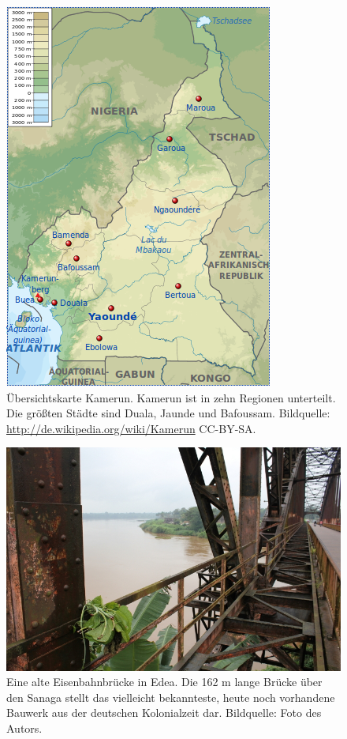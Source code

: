 \documentclass[a4paper,
fontsize=11pt,
oneside,
numbers=noperiodatend,
parskip=half-,
bibliography=totoc,
final
]{scrartcl}
\begin{document}
\begin{figure}[htbp]
\centering
\includegraphics{img/KarteKamerun.png}
\caption{Übersichtskarte Kamerun. Kamerun ist in zehn Regionen
unterteilt. Die größten Städte sind Duala, Jaunde und Bafoussam.
Bildquelle: \url{http://de.wikipedia.org/wiki/Kamerun} CC-BY-SA.}
\end{figure}

\begin{figure}[htbp]
\centering
\includegraphics{img/BruckeEdea.jpg}
\caption{Eine alte Eisenbahnbrücke in Edea. Die 162 m lange Brücke über
den Sanaga stellt das vielleicht bekannteste, heute noch vorhandene
Bauwerk aus der deutschen Kolonialzeit dar. Bildquelle: Foto des
Autors.}
\end{figure}
\end{document}
